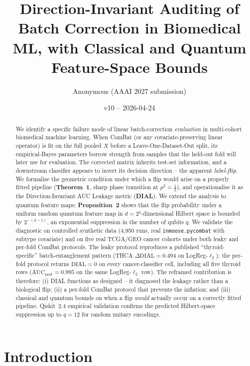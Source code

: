 \documentclass[letterpaper,11pt]{article}
\title{Direction-Invariant Auditing of Batch Correction in
 Biomedical ML, with Classical and Quantum Feature-Space Bounds}
\author{Anonymous (AAAI 2027 submission)}
\date{v10 -- 2026-04-24}
\begin{document}
\maketitle

\begin{abstract}
We identify a specific failure mode of linear batch-correction
\emph{evaluation} in multi-cohort biomedical machine learning. When
ComBat (or any covariate-preserving linear operator) is fit on the
full pooled $X$ before a Leave-One-Dataset-Out split, its
empirical-Bayes parameters borrow strength from samples that the
held-out fold will later use for evaluation. The corrected matrix
inherits test-set information, and a downstream classifier appears to
invert its decision direction -- the apparent \emph{label-flip}.
We formalise the geometric condition under which a flip would arise
on a properly fitted pipeline (\textbf{Theorem~1}, sharp phase
transition at $\rho^2 = \tfrac12$), and operationalise it as the
Direction-Invariant AUC Leakage metric (\textbf{DIAL}). We extend the
analysis to quantum feature maps: \textbf{Proposition~2} shows that
the flip probability under a uniform random quantum feature map in
$d=2^{q}$-dimensional Hilbert space is bounded by $2^{-(d-1)}$, an
exponential suppression in the number of qubits $q$. We validate the
diagnostic on controlled synthetic data (4{,}950 runs, real
\texttt{inmoose.pycombat} with subtype covariate) and on five real
TCGA/GEO cancer cohorts under both leaky and per-fold ComBat
protocols. The leaky protocol reproduces a published
``thyroid-specific'' batch-entanglement pattern (THCA $\Delta\mathrm{DIAL}=0.494$
on LogReg-$\ell_2$); the per-fold protocol returns
$\mathrm{DIAL} = 0$ on every cancer-classifier cell, including all
five thyroid rows ($\mathrm{AUC}_{\mathrm{post}} = 0.995$ on the same
LogReg-$\ell_2$ row). The reframed contribution is therefore: (i)
DIAL functions as designed -- it diagnosed the leakage rather than a
biological flip; (ii) a per-fold ComBat protocol that prevents the
inflation; and (iii) classical and quantum bounds on when a flip
\emph{would} actually occur on a correctly fitted pipeline. Qiskit~2.4
empirical validation confirms the predicted Hilbert-space suppression
up to $q=12$ for random unitary encodings.
\end{abstract}

\section{Introduction}
\label{sec:intro}
\end{document}
